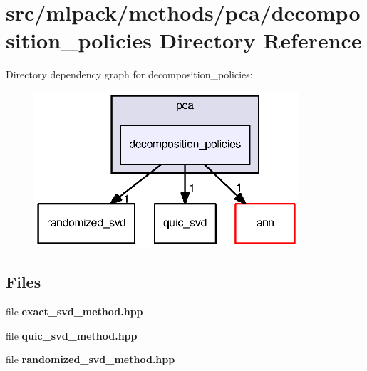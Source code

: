 \section{src/mlpack/methods/pca/decomposition\+\_\+policies Directory Reference}
\label{dir_eaf3eb2f8fbf029de397988dd3888058}
Directory dependency graph for decomposition\+\_\+policies\+:
\nopagebreak
\begin{figure}[H]
\begin{center}
\leavevmode
\includegraphics[width=278pt]{dir_eaf3eb2f8fbf029de397988dd3888058_dep}
\end{center}
\end{figure}
\subsection*{Files}
\begin{DoxyCompactItemize}
\item 
file {\bf exact\+\_\+svd\+\_\+method.\+hpp}
\item 
file {\bf quic\+\_\+svd\+\_\+method.\+hpp}
\item 
file {\bf randomized\+\_\+svd\+\_\+method.\+hpp}
\end{DoxyCompactItemize}
